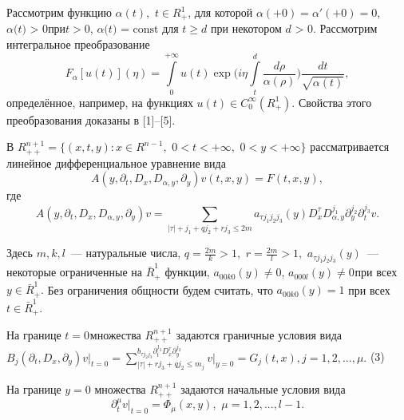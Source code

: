 


\vzmscaption

Рассмотрим функцию $\alpha (t),\,\,t \in R_ + ^1 $, для которой $\alpha ( +
0) = {\alpha }'( + 0) = 0$, $\alpha \mbox{(}t\mbox{) > 0}$при$t > 0$,
$\alpha \mbox{(}t\mbox{) = const}$ для $t \geqslant d$ при некотором $d\mbox{ >
0}$. Рассмотрим интегральное преобразование
\[
F_\alpha [u(t)](\eta ) = \int\limits_0^{ + \infty } {u(t)\exp (i\eta }
\int\limits_t^d {\frac{d\rho }{\alpha (\rho )}} )\frac{dt}{\sqrt {\alpha
(t)} },
\]
определённое, например, на функциях
$u(t) \in C_0^\infty (R_ + ^1 )$.
Свойства этого преобразования доказаны в [1]--[5].

В $R_{ + + }^{n + 1} = \{(x,t,y):x \in R^{n - 1},\,\,0 < t < + \infty ,\,\,0
< y < + \infty \}$ рассматривается линейное дифференциальное уравнение вида
\begin{equation}
\label{eq4700}
A(y,\partial _t ,D_x ,D_{\alpha ,y} ,\partial _y )v(t,x,y) = F(t,x,y),
\end{equation}
где
\begin{equation}
\label{eq4701}
A(y,\partial _t ,D_x ,D_{\alpha ,y} ,\partial _y )v = \sum\limits_{\left|
\tau \right| + j_1 + qj_2 + rj_3 \leqslant 2m} {a_{\tau j_1 j_2 j_3 } (y)D_x^\tau
D_{\alpha ,y}^{j_1 } } \partial _y^{j_2 } \partial _t^{j_3 } v.
\end{equation}



Здесь $m,k,l$~--- натуральные числа, $q = \frac{2m}{k} > 1,\,\,r = \frac{2m}{l} >
1,\,\,a_{\tau j_1 j_2 j_3 } (y)$~--- некоторые ограниченные на $\bar {R}_ + ^1
$ функции,
\linebreak
$a_{00k0} (y) \ne 0$, $a_{000l} (y) \ne 0_{ }$при всех$y \in
\bar {R}_ + ^1 .$ Без ограничения общности будем считать, что $a_{00k0} (y)
= 1$ при всех $t \in \bar {R}_ + ^1 .$

На границе $t = 0_{ }$множества $R_{ + + }^{n + 1} $ задаются граничные
условия вида$B_j (\partial _t ,D_x ,\partial _y )\left. v \right|_{t = 0} =
\sum\limits_{\left| \tau \right| + rj_3 + qj_2 \leqslant m_j }^ {b_{\tau j_2 j_3 }
\partial _t^{j_3 } D_x^\tau \partial _y^{j_2 } } \left. v \right|_{y = 0} =
G_j (t,x),j = 1,2,...,\mu .$ (3)

На границе $y = 0$ множества $R_{ + + }^{n + 1} $ задаются начальные условия
вида
\begin{equation}
\label{eq4702}
\partial _t^\mu \left. v \right|_{t = 0} = \Phi _\mu (x,y),\,\,\mu =
1,2,...,l - 1.
\end{equation}



